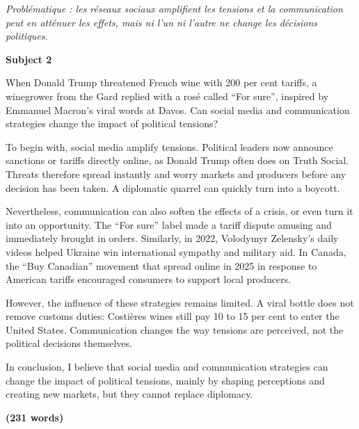\documentclass[11pt,a4paper]{article}
\begin{document}
\emph{Problématique : les réseaux sociaux amplifient les tensions et la communication peut en atténuer les effets, mais ni l'un ni l'autre ne change les décisions politiques.}

\textbf{Subject 2}

When Donald Trump threatened French wine with 200 per cent tariffs, a winegrower from the Gard replied with a rosé called ``For sure'', inspired by Emmanuel Macron's viral words at Davos. Can social media and communication strategies change the impact of political tensions?

To begin with, social media amplify tensions. Political leaders now announce sanctions or tariffs directly online, as Donald Trump often does on Truth Social. Threats therefore spread instantly and worry markets and producers before any decision has been taken. A diplomatic quarrel can quickly turn into a boycott.

Nevertheless, communication can also soften the effects of a crisis, or even turn it into an opportunity. The ``For sure'' label made a tariff dispute amusing and immediately brought in orders. Similarly, in 2022, Volodymyr Zelensky's daily videos helped Ukraine win international sympathy and military aid. In Canada, the ``Buy Canadian'' movement that spread online in 2025 in response to American tariffs encouraged consumers to support local producers.

However, the influence of these strategies remains limited. A viral bottle does not remove customs duties: Costières wines still pay 10 to 15 per cent to enter the United States. Communication changes the way tensions are perceived, not the political decisions themselves.

In conclusion, I believe that social media and communication strategies can change the impact of political tensions, mainly by shaping perceptions and creating new markets, but they cannot replace diplomacy.

\textbf{(231 words)}
\end{document}
